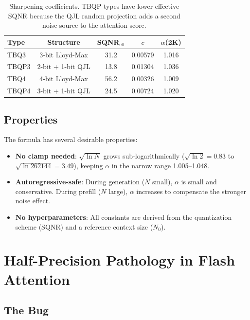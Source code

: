 \documentclass[10pt,twocolumn]{article}
\begin{document}
\begin{table}[h]
\centering
\small
\begin{tabular}{@{}lcccc@{}}
\toprule
Type & Structure & SQNR$_\text{eff}$ & $c$ & $\alpha$(2K) \\
\midrule
TBQ3  & 3-bit Lloyd-Max     & 31.2 & 0.00579 & 1.016 \\
TBQP3 & 2-bit + 1-bit QJL   & 13.8 & 0.01304 & 1.036 \\
TBQ4  & 4-bit Lloyd-Max     & 56.2 & 0.00326 & 1.009 \\
TBQP4 & 3-bit + 1-bit QJL   & 24.5 & 0.00724 & 1.020 \\
\bottomrule
\end{tabular}
\caption{Sharpening coefficients. TBQP types have lower effective SQNR because the QJL random projection adds a second noise source to the attention score.}
\label{tab:alpha}
\end{table}

\subsection{Properties}

The formula has several desirable properties:
\begin{itemize}[leftmargin=*,topsep=2pt,itemsep=1pt]
\item \textbf{No clamp needed}: $\sqrt{\ln N}$ grows sub-logarithmically ($\sqrt{\ln 2} = 0.83$ to $\sqrt{\ln 262144} = 3.49$), keeping $\alpha$ in the narrow range 1.005--1.048.
\item \textbf{Autoregressive-safe}: During generation ($N$ small), $\alpha$ is small and conservative. During prefill ($N$ large), $\alpha$ increases to compensate the stronger noise effect.
\item \textbf{No hyperparameters}: All constants are derived from the quantization scheme (SQNR) and a reference context size ($N_0$).
\end{itemize}

\section{Half-Precision Pathology in Flash Attention}
\label{sec:precision}

\subsection{The Bug}
\end{document}
